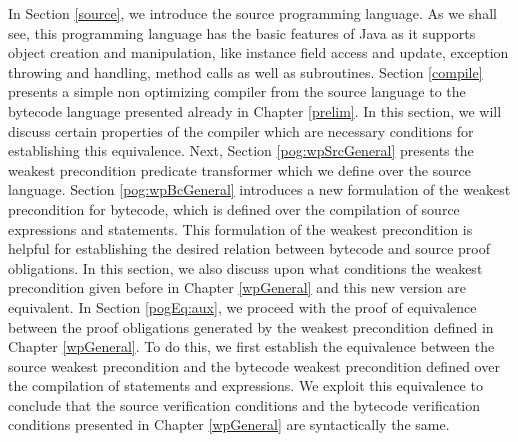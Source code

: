  In Section \ref{source},  we introduce the source programming language. As we shall see,
this programming language has the basic features of Java as it supports object creation and manipulation, like instance 
field access and  update, 
 exception throwing and handling, method calls as well as subroutines. Section \ref{compile} presents a simple non optimizing compiler from the source language to the bytecode
 language presented already in Chapter \ref{prelim}. In this section, we will discuss certain properties of the 
compiler which are necessary conditions for establishing this equivalence. Next, Section \ref{pog:wpSrcGeneral} presents the weakest precondition predicate 
transformer which we define over the source language. Section  \ref{pog:wpBcGeneral} introduces a new formulation of the weakest precondition for bytecode, which 
is defined over the  compilation of source expressions and statements. This formulation of the weakest precondition
 is helpful for establishing the desired 
relation between bytecode and source proof obligations.
 In this section, we also discuss upon what conditions
the weakest precondition given before in Chapter \ref{wpGeneral} and 
this new version are equivalent.
In Section \ref{pogEq:aux}, we proceed with the proof of equivalence between the proof obligations generated 
by the weakest precondition defined in  Chapter \ref{wpGeneral}.
To do this, we first establish  the equivalence between the source weakest precondition and the bytecode weakest precondition
 defined over the compilation of statements and expressions. We exploit this equivalence 
to conclude that the source verification conditions and the bytecode verification conditions 
presented in Chapter \ref{wpGeneral} are syntactically the same.
 








